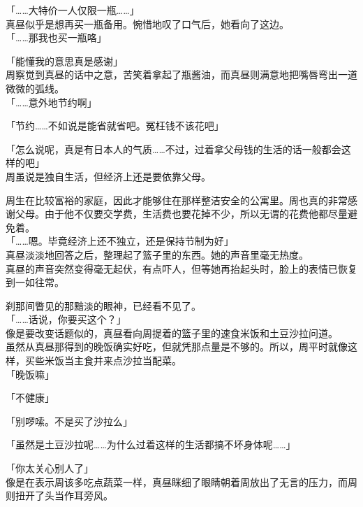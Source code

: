 「……大特价一人仅限一瓶……」\\

真昼似乎是想再买一瓶备用。惋惜地叹了口气后，她看向了这边。\\

「……那我也买一瓶咯」

「能懂我的意思真是感谢」\\

周察觉到真昼的话中之意，苦笑着拿起了瓶酱油，而真昼则满意地把嘴唇弯出一道微微的弧线。\\

「……意外地节约啊」

「节约……不如说是能省就省吧。冤枉钱不该花吧」

「怎么说呢，真是有日本人的气质……不过，过着拿父母钱的生活的话一般都会这样的吧」\\

周虽说是独自生活，但经济上还是要依靠父母。

周生在比较富裕的家庭，因此才能够住在那样整洁安全的公寓里。周也真的非常感谢父母。由于他不仅要交学费，生活费也要花掉不少，所以无谓的花费他都尽量避免着。\\

「……嗯。毕竟经济上还不独立，还是保持节制为好」\\

真昼淡淡地回答之后，整理起了篮子里的东西。她的声音里毫无热度。\\

真昼的声音突然变得毫无起伏，有点吓人，但等她再抬起头时，脸上的表情已恢复到一如往常。

刹那间瞥见的那黯淡的眼神，已经看不见了。\\

「……话说，你要买这个？」\\

像是要改变话题似的，真昼看向周提着的篮子里的速食米饭和土豆沙拉问道。\\

虽然从真昼那得到的晚饭确实好吃，但就凭那点量是不够的。所以，周平时就像这样，买些米饭当主食并来点沙拉当配菜。\\

「晚饭嘛」

「不健康」

「别啰嗦。不是买了沙拉么」

「虽然是土豆沙拉呢……为什么过着这样的生活都搞不坏身体呢……」

「你太关心别人了」\\

像是在表示周该多吃点蔬菜一样，真昼眯细了眼睛朝着周放出了无言的压力，而周则扭开了头当作耳旁风。\\

